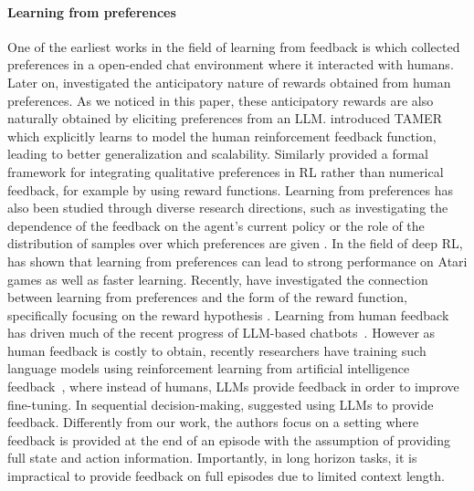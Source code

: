 \documentclass{article} %
\begin{document}
\paragraph{Learning from preferences} 
One of the earliest works in the field of learning from feedback is \citet{Isbell2001ASR} which collected preferences in a open-ended chat environment where it interacted with humans. Later on, \citet{thomaz2006reinforcement} investigated the anticipatory nature of rewards obtained from human preferences. As we noticed in this paper, these anticipatory rewards are also naturally obtained by eliciting preferences from an LLM.  \citet{knox2009interactively} introduced TAMER which explicitly learns to model the human reinforcement feedback function, leading to better generalization and scalability. Similarly \citet{furnkranz2012preference} provided a formal framework for integrating qualitative preferences in RL rather than numerical feedback, for example by using reward functions. 
Learning from preferences has also been studied through diverse research directions, such as investigating the dependence of the feedback on the agent's current policy 
\citep{MacGlashan2017InteractiveLF,Arumugam2019DeepRL} or the role of the distribution of samples over which preferences are given \citep{Sadigh2017ActivePL}. 
In the field of deep RL,
\citet{christiano2017deep} has shown that learning from preferences can lead to strong performance on Atari games as well as faster learning. 
Recently, \citet{Bowling2022SettlingTR} have investigated the connection between learning from preferences and the form of the reward function, specifically focusing on the reward hypothesis \citep{sutton2004reward}.
Learning from human feedback has driven much of the recent progress of LLM-based chatbots~\citep{brown2020language,ouyang2022training,touvron2023llama,rafailov2023direct}. However as human feedback is costly to obtain, recently researchers have training such language models using reinforcement learning from artificial intelligence feedback~\citep{bai2022constitutional,lee2023rlaif}, where instead of humans, LLMs provide feedback in order to improve fine-tuning. In sequential decision-making, \citet{kwon2022reward} suggested using LLMs to provide feedback. Differently from our work, the authors focus on a setting where feedback is provided at the end of an episode with the assumption of providing full state and action information. Importantly, in long horizon tasks, it is impractical to provide feedback on full episodes due to limited context length. 
\end{document}
